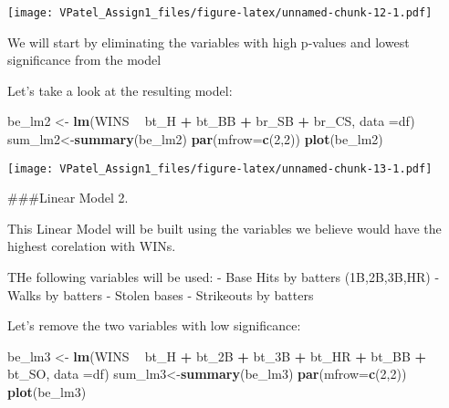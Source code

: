 \documentclass[]{article}
\newenvironment{Shaded}{\begin{snugshade}}{\end{snugshade}}
\newcommand{\DataTypeTok}[1]{\textcolor[rgb]{0.13,0.29,0.53}{#1}}
\newcommand{\DecValTok}[1]{\textcolor[rgb]{0.00,0.00,0.81}{#1}}
\newcommand{\KeywordTok}[1]{\textcolor[rgb]{0.13,0.29,0.53}{\textbf{#1}}}
\newcommand{\NormalTok}[1]{#1}
\newcommand{\OperatorTok}[1]{\textcolor[rgb]{0.81,0.36,0.00}{\textbf{#1}}}
\newcommand{\StringTok}[1]{\textcolor[rgb]{0.31,0.60,0.02}{#1}}
\begin{document}
\texttt{[image: VPatel\_Assign1\_files/figure-latex/unnamed-chunk-12-1.pdf]}

We will start by eliminating the variables with high p-values and lowest
significance from the model

Let's take a look at the resulting model:

\begin{Shaded}
\begin{Highlighting}[]
\NormalTok{be_lm2 <-}\StringTok{ }\KeywordTok{lm}\NormalTok{(WINS }\OperatorTok{~}\StringTok{ }\NormalTok{bt_H }\OperatorTok{+}\StringTok{ }\NormalTok{bt_BB }\OperatorTok{+}\StringTok{ }\NormalTok{br_SB }\OperatorTok{+}\StringTok{ }\NormalTok{br_CS, }\DataTypeTok{data =}\NormalTok{df)}
\NormalTok{sum_lm2<-}\KeywordTok{summary}\NormalTok{(be_lm2)}
\KeywordTok{par}\NormalTok{(}\DataTypeTok{mfrow=}\KeywordTok{c}\NormalTok{(}\DecValTok{2}\NormalTok{,}\DecValTok{2}\NormalTok{))}
\KeywordTok{plot}\NormalTok{(be_lm2)}
\end{Highlighting}
\end{Shaded}

\texttt{[image: VPatel\_Assign1\_files/figure-latex/unnamed-chunk-13-1.pdf]}

\#\#\#Linear Model 2.

This Linear Model will be built using the variables we believe would
have the highest corelation with WINs.

THe following variables will be used: - Base Hits by batters
(1B,2B,3B,HR) - Walks by batters - Stolen bases - Strikeouts by batters

Let's remove the two variables with low significance:

\begin{Shaded}
\begin{Highlighting}[]
\NormalTok{be_lm3 <-}\StringTok{ }\KeywordTok{lm}\NormalTok{(WINS }\OperatorTok{~}\StringTok{ }\NormalTok{bt_H }\OperatorTok{+}\StringTok{ }\NormalTok{bt_2B }\OperatorTok{+}\StringTok{ }\NormalTok{bt_3B }\OperatorTok{+}\StringTok{ }\NormalTok{bt_HR }\OperatorTok{+}\StringTok{ }\NormalTok{bt_BB }\OperatorTok{+}\StringTok{ }\NormalTok{bt_SO, }\DataTypeTok{data =}\NormalTok{df)}
\NormalTok{sum_lm3<-}\KeywordTok{summary}\NormalTok{(be_lm3)}
\KeywordTok{par}\NormalTok{(}\DataTypeTok{mfrow=}\KeywordTok{c}\NormalTok{(}\DecValTok{2}\NormalTok{,}\DecValTok{2}\NormalTok{))}
\KeywordTok{plot}\NormalTok{(be_lm3)}
\end{Highlighting}
\end{Shaded}
\end{document}
